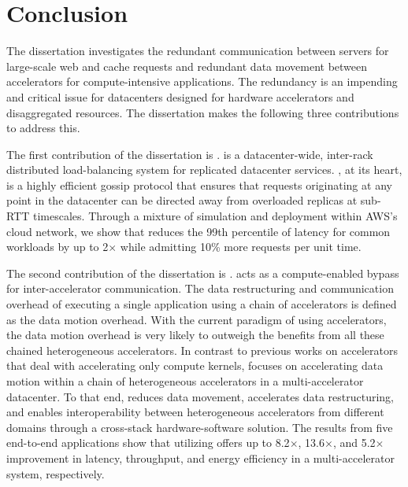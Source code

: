 \chapter{Conclusion}
\label{conclusion:chap}
%
The dissertation investigates the redundant communication between servers for large-scale web and cache requests and redundant data movement between accelerators for compute-intensive applications.
%
The redundancy is an impending and critical issue for datacenters designed for hardware accelerators and disaggregated resources.
% 
The dissertation makes the following three contributions to address this.


The first contribution of the dissertation is \daronpon. 
%
\daronpon is a datacenter-wide, inter-rack distributed load-balancing system for replicated datacenter services.  
%
\daronpon, at its heart, is a highly efficient gossip protocol that ensures that requests originating at any point in the datacenter can be directed away from overloaded replicas at sub-RTT timescales.
%
Through a mixture of simulation and deployment within AWS's cloud network, we show that \daronpon reduces the 99th percentile of latency for common workloads by up to 2$\times$ while admitting 10\% more requests per unit time. 

The second contribution of the dissertation is \dmx. 
%
\dmx acts as a compute-enabled bypass for inter-accelerator communication. 
%
The data restructuring and communication overhead of executing a single application using a chain of accelerators is defined as the data motion overhead.
%
With the current paradigm of using accelerators, the data motion overhead is very likely to outweigh the benefits from all these chained heterogeneous accelerators.
%
In contrast to previous works on accelerators that deal with accelerating only compute kernels, \dmx focuses on accelerating data motion within a chain of heterogeneous accelerators in a multi-accelerator datacenter.
%
To that end, \dmx reduces data movement, accelerates data restructuring, and enables interoperability between heterogeneous accelerators from different domains through a cross-stack hardware-software solution. 
%
The results from five end-to-end applications show that utilizing \dmx offers up to 8.2$\times$, 13.6$\times$, and 5.2$\times$ improvement in latency, throughput, and energy efficiency in a multi-accelerator system, respectively.

